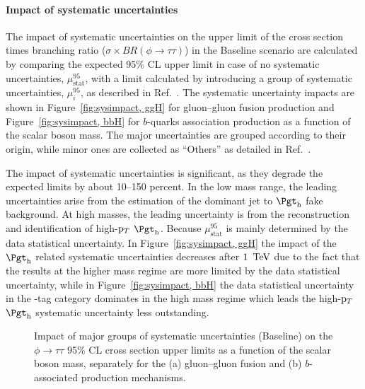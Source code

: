 \paragraph{Impact of systematic uncertainties}
The impact of systematic uncertainties on the upper limit of the cross section times branching ratio ($\sigma\times BR(\phi\to\tau\tau)$) in the Baseline scenario are calculated by comparing the expected 95\% CL upper limit in case of no systematic uncertainties, $\mu^{95}_{\text{stat}}$, with a limit calculated by introducing a group of systematic uncertainties, $\mu^{95}_i$, as described in Ref.~\cite{ATLASRun2Ditau}. The systematic uncertainty impacts are shown in Figure~\ref{fig:sysimpact, ggH} for gluon--gluon fusion production and Figure~\ref{fig:sysimpact, bbH} for $b$-quarks association production as a function of the scalar boson mass. The major uncertainties are grouped according to their origin, while minor ones are collected as ``Others'' as detailed in Ref.~\cite{ATLASRun2Ditau}.

The impact of systematic uncertainties is significant, as they degrade the expected limits by about 10--150 percent. In the low mass range, the leading uncertainties arise from the estimation of the dominant jet to $\tauhad$ fake background. At high masses, the leading uncertainty is from the reconstruction and identification of high-$\mathrm{p}_{T}$ $\tauhad$. Because $\mu^{95}_{\text{stat}}$ is mainly determined by the data statistical uncertainty. In Figure~\ref{fig:sysimpact, ggH} the impact of the $\tauhad$ related systematic uncertainties decreases after $1~\,\text{Te\hspace{-.08em}V}$ due to the fact that the results at the higher mass regime are more limited by the data statistical uncertainty, while in Figure~\ref{fig:sysimpact, bbH} the data statistical uncertainty in the \PQb-tag category dominates in the high mass regime which leads the high-$\mathrm{p}_{T}$ $\tauhad$ systematic uncertainty less outstanding.

\begin{figure}[!ht]
    \centering
        \qquad
        \caption{Impact of major groups of systematic uncertainties (Baseline) on the $\phi\to\tau\tau$ 95\% CL cross section upper limits as a function of the scalar boson mass, separately for the (a) gluon--gluon fusion and (b) $b$-associated production mechanisms.}
    \label{fig:sysimpact}
\end{figure}

